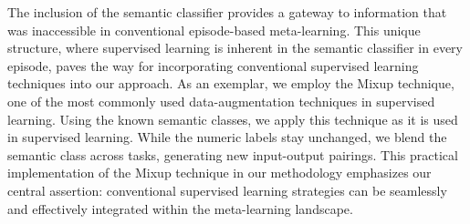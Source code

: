 \documentclass[letterpaper]{article} %
\newcommand{\nj}[1]{\textcolor{black}{#1}}
\newcommand{\yr}[1]{\textcolor{black}{#1}}
\begin{document}
The inclusion of the semantic classifier provides a gateway to information that was %
inaccessible %
in conventional episode-based meta-learning. This unique structure, where supervised learning is inherent in the semantic classifier in every episode, paves the way for incorporating conventional supervised learning techniques into our approach.
As an exemplar, we employ the Mixup technique, one of the most commonly used data-augmentation techniques in supervised learning. Using the known semantic class\nj{es}, we apply this technique as it is used in supervised learning. %
While the numeric labels stay unchanged, we blend the semantic class across tasks, generating new input-output pairings.
This practical implementation of the Mixup technique in our methodology emphasizes our central assertion: conventional supervised learning strategies can be seamlessly and effectively integrated within the meta-learning landscape.

\end{document}
